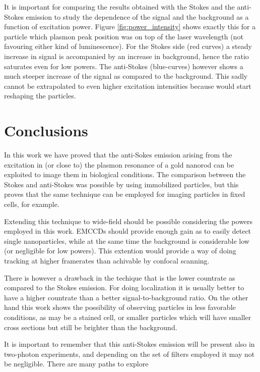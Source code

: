 \documentclass[twocolumn]{article}
\begin{document}
It is important for comparing the results obtained with the Stokes and the
anti-Stokes emission to study the dependence of the signal and the background as
a function of excitation power. Figure \ref{fig:power_intensity} shows exactly
this for a particle which plasmon peak position was on top of the laser
wavelength (not favouring either kind of luminescence). For the Stokes side
(red curves) a steady increase in signal is accompanied by an increase in
background, hence the ratio saturates even for low powers. The anti-Stokes
(blue-curves) however shows a much steeper increase of the signal as compared
to the background. This sadly cannot be extrapolated to even higher excitation
intensities because would start reshaping the particles. 

\section{Conclusions}
In this work we have proved that the anti-Sokes emission arising from the
excitation in (or close to) the plasmon resonance of a gold nanorod can be
exploited to image them in biological conditions. The comparison between the
Stokes and anti-Stokes was possible by using immobilized particles, but this
proves that the same technique can be employed for imaging particles in fixed
cells, for example. 

Extending this technique to wide-field should be possible considering the powers
employed in this work. EMCCDs should provide enough gain as to easily detect
single nanoparticles, while at the same time the background is considerable low
(or negligible for low powers). This extention would provide a way of doing
tracking at higher framerates than achivable by confocal scanning. 

There is however a drawback in the techique that is the lower countrate as
compared to the Stokes emission. For doing localization it is usually better to
have a higher countrate than a better signal-to-background ratio. On the other
hand this work shows the possibility of observing particles in less favorable
conditions, as may be a stained cell, or smaller particles which will have
smaller cross sections but still be brighter than the background. 

It is important to remember that this anti-Stokes emission will be present also
in two-photon experiments, and depending on the set of filters employed it may
not be negligible. There are many paths to explore
\end{document}
